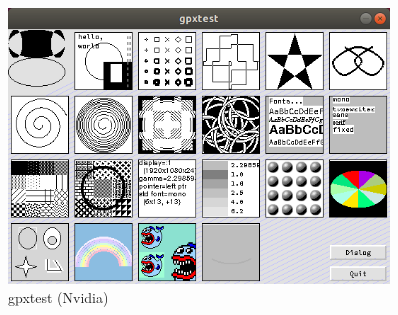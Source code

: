 \documentclass[letterpaper,12pt]{article}
\begin{document}
\begin{figure}[h!]
\begin{minipage}{0.33\textwidth}
    \includegraphics[width=0.9\textwidth]{gpxtest-ogl-nvidia.png}
    \caption{gpxtest (Nvidia)}
  \end{minipage}\hfill
\end{figure}
\end{document}
